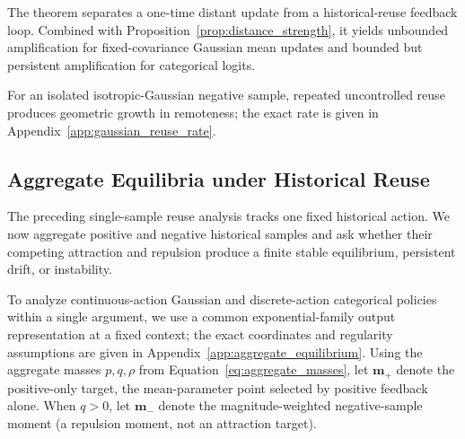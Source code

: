 \documentclass{article}
\theoremstyle{plain}
\theoremstyle{definition}
\theoremstyle{remark}
\begin{document}
The theorem separates a one-time distant update from a historical-reuse
feedback loop. Combined with Proposition~\ref{prop:distance_strength}, it
yields unbounded amplification for fixed-covariance Gaussian mean updates
and bounded but persistent amplification for categorical logits.

For an isolated isotropic-Gaussian negative sample, repeated
uncontrolled reuse produces geometric growth in remoteness; the exact
rate is given in Appendix~\ref{app:gaussian_reuse_rate}.

\subsection{Aggregate Equilibria under Historical Reuse}
\label{sec:aggregate_equilibria}

The preceding single-sample reuse analysis tracks one fixed historical
action. We now aggregate positive and negative historical samples and
ask whether their competing attraction and repulsion produce a finite
stable equilibrium, persistent drift, or instability.

To analyze continuous-action Gaussian and discrete-action categorical
policies within a single argument, we use a common exponential-family
output representation at a fixed context; the exact coordinates and
regularity assumptions are given in
Appendix~\ref{app:aggregate_equilibrium}. Using the aggregate masses
\(p,q,\rho\) from Equation~\eqref{eq:aggregate_masses}, let
\(\mathbf m_+\) denote the positive-only target, the mean-parameter point
selected by positive feedback alone. When \(q>0\), let \(\mathbf m_-\)
denote the magnitude-weighted negative-sample moment (a repulsion moment,
not an attraction target).
\end{document}
